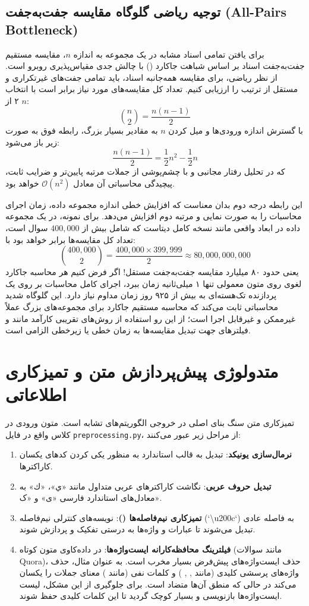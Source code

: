 \documentclass[12pt,onecolumn,a4paper]{article}
\begin{document}
\subsection{توجیه ریاضی گلوگاه مقایسه جفت‌به‌جفت (All-Pairs Bottleneck)}
برای یافتن تمامی اسناد مشابه در یک مجموعه به اندازه $n$، مقایسه مستقیم جفت‌به‌جفت اسناد بر اساس شباهت جاکارد () با چالش جدی مقیاس‌پذیری روبرو است. از نظر ریاضی، برای مقایسه همه‌جانبه اسناد، باید تمامی جفت‌های غیرتکراری و مستقل از ترتیب را ارزیابی کنیم. تعداد کل مقایسه‌های مورد نیاز برابر است با انتخاب ۲ از $n$:
\[
\binom{n}{2} = \frac{n(n-1)}{2}
\]
با گسترش اندازه ورودی‌ها و میل کردن $n$ به مقادیر بسیار بزرگ، رابطه فوق به صورت زیر باز می‌شود:
\[
\frac{n(n-1)}{2} = \frac{1}{2}n^2 - \frac{1}{2}n
\]
که در تحلیل رفتار مجانبی و با چشم‌پوشی از جملات مرتبه پایین‌تر و ضرایب ثابت، پیچیدگی محاسباتی آن معادل $\mathcal{O}(n^2)$ خواهد بود.

این رابطه درجه دوم بدان معناست که افزایش خطی اندازه مجموعه داده، زمان اجرای محاسبات را به صورت نمایی و مرتبه دوم افزایش می‌دهد. برای نمونه، در یک مجموعه داده در ابعاد واقعی مانند نسخه کامل دیتاست  که شامل بیش از $400,000$ سوال است، تعداد کل مقایسه‌ها برابر خواهد بود با:
\[
\binom{400,000}{2} = \frac{400,000 \times 399,999}{2} \approx 80,000,000,000
\]
یعنی حدود ۸۰ میلیارد مقایسه جفت‌به‌جفت مستقل! اگر فرض کنیم هر محاسبه جاکارد لغوی روی متون معمولی تنها ۱ میلی‌ثانیه زمان ببرد، اجرای کامل محاسبات بر روی یک پردازنده تک‌هسته‌ای به بیش از ۹۲۵ روز زمان مداوم نیاز دارد. این گلوگاه شدید محاسباتی ثابت می‌کند که محاسبه مستقیم جاکارد برای مجموعه‌های بزرگ عملاً غیرممکن و غیرقابل اجرا است؛ از این رو استفاده از روش‌های تقریبی کارآمد مانند  و فیلترهای  جهت تبدیل مقایسه‌ها به زمان خطی یا زیرخطی الزامی است.

\section{متدولوژی پیش‌پردازش متن و تمیزکاری اطلاعاتی}

تمیزکاری متن سنگ بنای اصلی در خروجی الگوریتم‌های تشابه است. متون ورودی در کلاس  واقع در فایل \texttt{preprocessing.py}، از مراحل زیر عبور می‌کنند:
\begin{enumerate}
\item \textbf{نرمال‌سازی یونیکد}: تبدیل به قالب استاندارد  به منظور یکی کردن کدهای یکسان کاراکترها.
\item \textbf{تبدیل حروف عربی}: نگاشت کاراکترهای عربی متداول مانند «ي»، «ك» به معادل‌های استاندارد فارسی «ی» و «ک».
\item \textbf{تمیزکاری نیم‌فاصله‌ها ()}: نویسه‌های کنترلی نیم‌فاصله (`\textbackslash u200c`) به فاصله عادی تبدیل می‌شوند تا عبارات و واژه‌ها به درستی تفکیک و پردازش شوند.
\item \textbf{فیلترینگ محافظه‌کارانه ایست‌واژه‌ها}: در داده‌کاوی متون کوتاه (مانند سوالات Quora)، حذف ایست‌واژه‌های پیش‌فرض بسیار مخرب است. به عنوان مثال، حذف واژه‌های پرسشی کلیدی (مانند , , ) و کلمات نفی (مانند ) معنای جملات را یکسان می‌کند در حالی که منطق آن‌ها متضاد است. برای جلوگیری از این مشکل، لیست ایست‌واژه‌ها بازنویسی و بسیار کوچک گردید تا این کلمات کلیدی حفظ شوند.
\end{enumerate}
\end{document}
